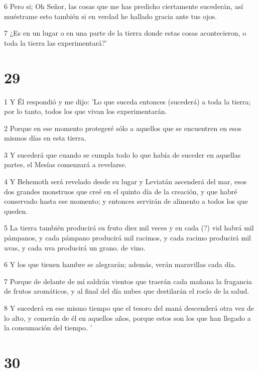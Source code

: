 \par 6 Pero si; Oh Señor, las cosas que me has predicho ciertamente sucederán, así muéstrame esto también si en verdad he hallado gracia ante tus ojos.

\par 7 ¿Es en un lugar o en una parte de la tierra donde estas cosas acontecieron, o toda la tierra las experimentará?'

\chapter{29}

\par 1 Y Él respondió y me dijo: 'Lo que suceda entonces (sucederá) a toda la tierra; por lo tanto, todos los que vivan los experimentarán.

\par 2 Porque en ese momento protegeré sólo a aquellos que se encuentren en esos mismos días en esta tierra.

\par 3 Y sucederá que cuando se cumpla todo lo que había de suceder en aquellas partes, el Mesías comenzará a revelarse.

\par 4 Y Behemoth será revelado desde su lugar y Leviatán ascenderá del mar, esos dos grandes monstruos que creé en el quinto día de la creación, y que habré conservado hasta ese momento; y entonces servirán de alimento a todos los que queden.

\par 5 La tierra también producirá su fruto diez mil veces y en cada (?) vid habrá mil pámpanos, y cada pámpano producirá mil racimos, y cada racimo producirá mil uvas, y cada uva producirá un grano. de vino.

\par 6 Y los que tienen hambre se alegrarán; además, verán maravillas cada día.

\par 7 Porque de delante de mí saldrán vientos que traerán cada mañana la fragancia de frutos aromáticos, y al final del día nubes que destilarán el rocío de la salud.

\par 8 Y sucederá en ese mismo tiempo que el tesoro del maná descenderá otra vez de lo alto, y comerán de él en aquellos años, porque estos son los que han llegado a la consumación del tiempo. '

\chapter{30}


